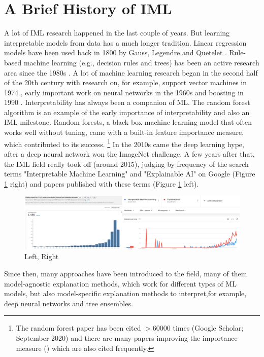 \documentclass[runningheads]{llncs}
\begin{document}
\section{A Brief History of IML}
A lot of IML research happened in the last couple of years.
But learning interpretable models from data has a much longer tradition.
Linear regression models have been used back in 1800 by Gauss, Legendre and Quetelet \cite{stigler1986history,legendre1805nouvelles,gauss1809theoria,quetelet1827recherches}.
Rule-based machine learning (e.g., decision rules and trees) has been an active research area since the 1980s \cite{furnkranz2012foundations}.
A lot of machine learning research began in the second half of the 20th century with research on, for example, support vector machines in 1974 \cite{vapnik1974theory}, early important work on neural networks in the 1960s \cite{schmidhuber2015deep} and boosting in 1990 \cite{schapire1990strength}.
Interpretability has always been a companion of ML.
The random forest algorithm  \cite{breiman2001random} is an example of the early importance of interpretability and also an IML milestone.
Random forests, a black box machine learning model that often works well without tuning, came with a built-in feature importance measure, which contributed to its success.
\footnote{The random forest paper has been cited  $>60000$ times (Google Scholar; September 2020) and there are many papers improving the importance measure (\cite{strobl2008conditional,strobl2007bias,hapfelmeier2014new,ishwaran2007variable}) which are also cited frequently.}
In the 2010s came the deep learning hype, after a deep neural network won the ImageNet challenge.
A few years after that, the IML field really took off (around 2015), judging by frequency of the search terms "Interpretable Machine Learning" and "Explainable AI" on Google (Figure \ref{fig:count} right) and papers published with these terms (Figure \ref{fig:count} left).
\begin{figure}
  \includegraphics[width=\textwidth]{citation-search.png}
  \caption{Left, Right}
  \label{fig:count}
\end{figure}
Since then, many approaches have been introduced to the field, many of them model-agnostic explanation methods, which work for different types of ML models, but also model-specific explanation methods to interpret,for example, deep neural networks and tree ensembles.
\end{document}
